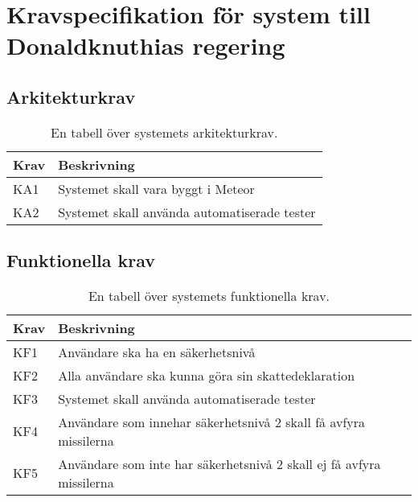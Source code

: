 \chapter{\hspace{2.6em} Kravspecifikation för system till Donaldknuthias regering}
\label{sec:workshop_kravspec_architecture}
\section{Arkitekturkrav}

\begin{table}[h!]
  \centering
  \caption{En tabell över systemets arkitekturkrav.}
  \def\arraystretch{1.5}
  \begin{adjustbox}{max width=\textwidth}
    \begin{tabularx}{\textwidth}{ | l | X | }
      \hline
      \textbf{Krav} & \textbf{Beskrivning} \\
      \hline
      KA1 & Systemet skall vara byggt i Meteor \\
      \hline
      KA2 & Systemet skall använda automatiserade tester \\
      \hline
    \end{tabularx}
  \end{adjustbox}
  \label{tab:workshop_arkitekturkrav}
\end{table}

\pagebreak

\section{Funktionella krav}
\label{sec:workshop_kravspec_functional}

\begin{table}[h!]
  \centering
  \caption{En tabell över systemets funktionella krav.}
  \def\arraystretch{1.5}
  \begin{adjustbox}{max width=\textwidth}
    \begin{tabularx}{\textwidth}{ | l | X | }
      \hline
      \textbf{Krav} & \textbf{Beskrivning} \\
      \hline
      KF1 & Användare ska ha en säkerhetsnivå \\
      \hline
      KF2 & Alla användare ska kunna göra sin skattedeklaration \\
      \hline
      KF3 & Systemet skall använda automatiserade tester \\
      \hline
      KF4 & Användare som innehar säkerhetsnivå 2 skall få avfyra missilerna \\
      \hline
      KF5 & Användare som inte har säkerhetsnivå 2 skall ej få avfyra missilerna \\
      \hline
    \end{tabularx}
  \end{adjustbox}
  \label{tab:workshop_funktionellakrav}
\end{table}
